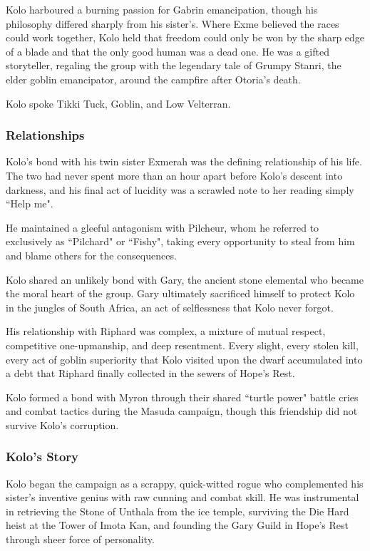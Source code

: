 Kolo harboured a burning passion for Gabrin emancipation, though his philosophy differed sharply from his sister's.  Where Exme believed the races could work together, Kolo held that freedom could only be won by the sharp edge of a blade and that the only good human was a dead one.  He was a gifted storyteller, regaling the group with the legendary tale of Grumpy Stanri, the elder goblin emancipator, around the campfire after Otoria's death.

Kolo spoke Tikki Tuck, Goblin, and Low Velterran.

\subsubsection{Relationships}

Kolo's bond with his twin sister Exmerah was the defining relationship of his life.  The two had never spent more than an hour apart before Kolo's descent into darkness, and his final act of lucidity was a scrawled note to her reading simply ``Help me".

He maintained a gleeful antagonism with Pilcheur, whom he referred to exclusively as ``Pilchard" or ``Fishy", taking every opportunity to steal from him and blame others for the consequences.

Kolo shared an unlikely bond with Gary, the ancient stone elemental who became the moral heart of the group.  Gary ultimately sacrificed himself to protect Kolo in the jungles of South Africa, an act of selflessness that Kolo never forgot.

His relationship with Riphard was complex, a mixture of mutual respect, competitive one-upmanship, and deep resentment.  Every slight, every stolen kill, every act of goblin superiority that Kolo visited upon the dwarf accumulated into a debt that Riphard finally collected in the sewers of Hope's Rest.

Kolo formed a bond with Myron through their shared ``turtle power" battle cries and combat tactics during the Masuda campaign, though this friendship did not survive Kolo's corruption.

\subsubsection{Kolo's Story}

Kolo began the campaign as a scrappy, quick-witted rogue who complemented his sister's inventive genius with raw cunning and combat skill.  He was instrumental in retrieving the Stone of Unthala from the ice temple, surviving the Die Hard heist at the Tower of Imota Kan, and founding the Gary Guild in Hope's Rest through sheer force of personality.

